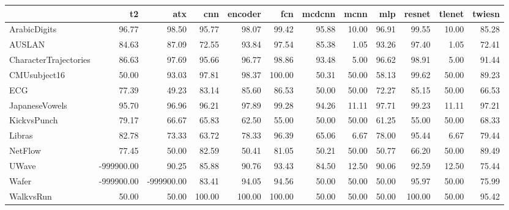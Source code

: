\begin{tabular}{lrrrrrrrrrrr}
\hline
                       &         t2 &        atx &    cnn &   encoder &    fcn &   mcdcnn &   mcnn &   mlp &   resnet &   tlenet &   twiesn \\
\hline
 ArabicDigits          &      96.77 &      98.50 &  95.77 &     98.07 &  99.42 &    95.88 &  10.00 & 96.91 &    99.55 &    10.00 &    85.28 \\
 AUSLAN                &      84.63 &      87.09 &  72.55 &     93.84 &  97.54 &    85.38 &   1.05 & 93.26 &    97.40 &     1.05 &    72.41 \\
 CharacterTrajectories &      86.63 &      97.69 &  95.66 &     96.77 &  98.86 &    93.48 &   5.00 & 96.62 &    98.91 &     5.00 &    91.44 \\
 CMUsubject16          &      50.00 &      93.03 &  97.81 &     98.37 & 100.00 &    50.31 &  50.00 & 58.13 &    99.62 &    50.00 &    89.23 \\
 ECG                   &      77.39 &      49.23 &  83.14 &     85.60 &  86.53 &    50.00 &  50.00 & 72.27 &    85.15 &    50.00 &    66.53 \\
 JapaneseVowels        &      95.70 &      96.96 &  96.21 &     97.89 &  99.28 &    94.26 &  11.11 & 97.71 &    99.23 &    11.11 &    97.21 \\
 KickvsPunch           &      79.17 &      66.67 &  65.83 &     62.50 &  55.00 &    50.00 &  50.00 & 61.25 &    55.00 &    50.00 &    68.33 \\
 Libras                &      82.78 &      73.33 &  63.72 &     78.33 &  96.39 &    65.06 &   6.67 & 78.00 &    95.44 &     6.67 &    79.44 \\
 NetFlow               &      77.45 &      50.00 &  82.59 &     50.41 &  81.05 &    50.21 &  50.00 & 50.77 &    66.20 &    50.00 &    89.49 \\
 UWave                 & -999900.00 &      90.25 &  85.88 &     90.76 &  93.43 &    84.50 &  12.50 & 90.06 &    92.59 &    12.50 &    75.44 \\
 Wafer                 & -999900.00 & -999900.00 &  83.41 &     94.05 &  94.56 &    50.00 &  50.00 & 50.00 &    95.97 &    50.00 &    75.99 \\
 WalkvsRun             &      50.00 &      50.00 & 100.00 &    100.00 & 100.00 &    50.00 &  50.00 & 50.00 &   100.00 &    50.00 &    95.42 \\
\hline
\end{tabular}
